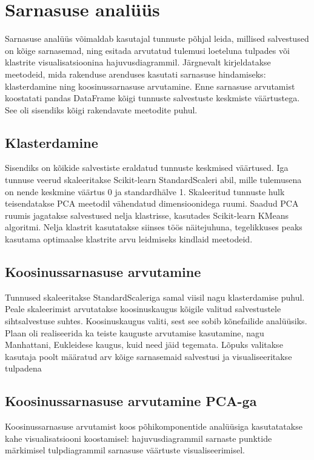 \section{Sarnasuse analüüs}
Sarnasuse analüüs võimaldab kasutajal tunnuste põhjal leida, millised salvestused on kõige sarnasemad, ning esitada arvutatud tulemusi loeteluna tulpades või klastrite visualisatsioonina hajuvusdiagrammil. Järgnevalt kirjeldatakse meetodeid, mida rakenduse arenduses kasutati sarnasuse hindamiseks: klasterdamine ning koosinussarnasuse arvutamine. Enne sarnasuse arvutamist koostatati pandas DataFrame kõigi tunnuste salvestuste keskmiste väärtustega. See oli sisendiks kõigi rakendavate meetodite puhul.

\subsection{Klasterdamine}
Sisendiks on kõikide salvestiste eraldatud tunnuste keskmised väärtused. Iga tunnuse veerud skaleeritakse Scikit-learn StandardScaleri \cite{scikit_standardscaler} abil, mille tulemusena on nende keskmine väärtus 0 ja standardhälve 1.
Skaleeritud tunnuste hulk teisendatakse PCA meetodil vähendatud dimensioonidega ruumi.
Saadud PCA ruumis jagatakse salvestused nelja klastrisse, kasutades Scikit-learn KMeans algoritmi. Nelja klastrit kasutatakse siinses töös näitejuhuna, tegelikkuses peaks kasutama optimaalse klastrite arvu leidmiseks kindlaid meetodeid.

\subsection{Koosinussarnasuse arvutamine}
Tunnused skaleeritakse StandardScaleriga samal viisil nagu klasterdamise puhul. Peale skaleerimist arvutatakse koosinuskaugus kõigile valitud salvestustele sihtsalvestuse suhtes. Koosinuskaugus valiti, sest see sobib kõnefailide analüüsiks. Plaan oli realiseerida ka teiste kauguste arvutamise kasutamine, nagu Manhattani, Eukleidese kaugus, kuid need jäid tegemata. Lõpuks valitakse kasutaja poolt määratud arv kõige sarnasemaid salvestusi ja visualiseeritakse tulpadena

\subsection{Koosinussarnasuse arvutamine PCA-ga}
Koosinussarnasuse arvutamist koos põhikomponentide analüüsiga kasutatatakse kahe visualisatsiooni koostamisel:
hajuvusdiagrammil sarnaste punktide märkimisel
tulpdiagrammil sarnasuse väärtuste visualiseerimisel.

